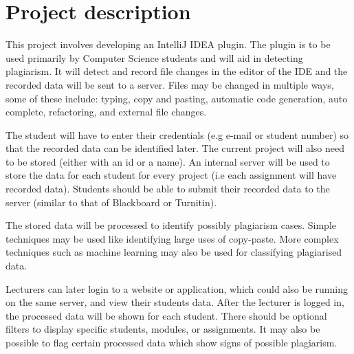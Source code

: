\section{Project description}
This project involves developing an IntelliJ IDEA plugin. The plugin is to be used primarily by Computer Science students and will aid in detecting plagiarism. It will detect and record file changes in the editor of the IDE and the recorded data will be sent to a server. Files may be changed in multiple ways, some of these include: typing, copy and pasting, automatic code generation, auto complete, refactoring, and external file changes.

The student will have to enter their credentials (e.g e-mail or student number) so that the recorded data can be identified later. The current project will also need to be stored (either with an id or a name). An internal server will be used to store the data for each student for every project (i.e each assignment will have recorded data). Students should be able to submit their recorded data to the server (similar to that of Blackboard or Turnitin).

The stored data will be processed to identify possibly plagiarism cases. Simple techniques may be used like identifying large uses of copy-paste. More complex techniques such as machine learning may also be used for classifying plagiarised data.

Lecturers can later login to a website or application, which could also be running on the same server, and view their students data. After the lecturer is logged in, the processed data will be shown for each student. There should be optional filters to display specific students, modules, or assignments. It may also be possible to flag certain processed data which show signs of possible plagiarism.
